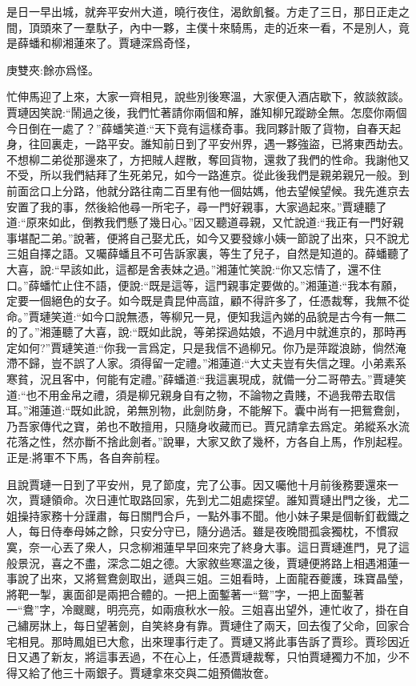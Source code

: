 \begin{parag}
    是日一早出城，就奔平安州大道，曉行夜住，渴飲飢餐。方走了三日，那日正走之間，頂頭來了一羣馱子，內中一夥，主僕十來騎馬，走的近來一看，不是別人，竟是薛蟠和柳湘蓮來了。賈璉深爲奇怪，\begin{note}庚雙夾:餘亦爲怪。\end{note}忙伸馬迎了上來，大家一齊相見，說些別後寒溫，大家便入酒店歇下，敘談敘談。賈璉因笑說:“鬧過之後，我們忙著請你兩個和解，誰知柳兄蹤跡全無。怎麼你兩個今日倒在一處了？”薛蟠笑道:“天下竟有這樣奇事。我同夥計販了貨物，自春天起身，往回裏走，一路平安。誰知前日到了平安州界，遇一夥強盜，已將東西劫去。不想柳二弟從那邊來了，方把賊人趕散，奪回貨物，還救了我們的性命。我謝他又不受，所以我們結拜了生死弟兄，如今一路進京。從此後我們是親弟親兄一般。到前面岔口上分路，他就分路往南二百里有他一個姑媽，他去望候望候。我先進京去安置了我的事，然後給他尋一所宅子，尋一門好親事，大家過起來。”賈璉聽了道:“原來如此，倒教我們懸了幾日心。”因又聽道尋親，又忙說道:“我正有一門好親事堪配二弟。”說著，便將自己娶尤氏，如今又要發嫁小姨一節說了出來，只不說尤三姐自擇之語。又囑薛蟠且不可告訴家裏，等生了兒子，自然是知道的。薛蟠聽了大喜，說:“早該如此，這都是舍表妹之過。”湘蓮忙笑說:“你又忘情了，還不住口。”薛蟠忙止住不語，便說:“既是這等，這門親事定要做的。”湘蓮道:“我本有願，定要一個絕色的女子。如今既是貴昆仲高誼，顧不得許多了，任憑裁奪，我無不從命。”賈璉笑道:“如今口說無憑，等柳兄一見，便知我這內娣的品貌是古今有一無二的了。”湘蓮聽了大喜，說:“既如此說，等弟探過姑娘，不過月中就進京的，那時再定如何?”賈璉笑道:“你我一言爲定，只是我信不過柳兄。你乃是萍蹤浪跡，倘然淹滯不歸，豈不誤了人家。須得留一定禮。”湘蓮道:“大丈夫豈有失信之理。小弟素系寒貧，況且客中，何能有定禮。”薛蟠道:“我這裏現成，就備一分二哥帶去。”賈璉笑道:“也不用金帛之禮，須是柳兄親身自有之物，不論物之貴賤，不過我帶去取信耳。”湘蓮道:“既如此說，弟無別物，此劍防身，不能解下。囊中尚有一把鴛鴦劍，乃吾家傳代之寶，弟也不敢擅用，只隨身收藏而已。賈兄請拿去爲定。弟縱系水流花落之性，然亦斷不捨此劍者。”說畢，大家又飲了幾杯，方各自上馬，作別起程。正是:將軍不下馬，各自奔前程。
\end{parag}


\begin{parag}
    且說賈璉一日到了平安州，見了節度，完了公事。因又囑他十月前後務要還來一次，賈璉領命。次日連忙取路回家，先到尤二姐處探望。誰知賈璉出門之後，尤二姐操持家務十分謹肅，每日關門合戶，一點外事不聞。他小妹子果是個斬釘截鐵之人，每日侍奉母姊之餘，只安分守已，隨分過活。雖是夜晚間孤衾獨枕，不慣寂寞，奈一心丟了衆人，只念柳湘蓮早早回來完了終身大事。這日賈璉進門，見了這般景況，喜之不盡，深念二姐之德。大家敘些寒溫之後，賈璉便將路上相遇湘蓮一事說了出來，又將鴛鴦劍取出，遞與三姐。三姐看時，上面龍吞夔護，珠寶晶瑩，將靶一掣，裏面卻是兩把合體的。一把上面鏨著一“鴛”字，一把上面鏨著一“鴦”字，冷颼颼，明亮亮，如兩痕秋水一般。三姐喜出望外，連忙收了，掛在自己繡房牀上，每日望著劍，自笑終身有靠。賈璉住了兩天，回去復了父命，回家合宅相見。那時鳳姐已大愈，出來理事行走了。賈璉又將此事告訴了賈珍。賈珍因近日又遇了新友，將這事丟過，不在心上，任憑賈璉裁奪，只怕賈璉獨力不加，少不得又給了他三十兩銀子。賈璉拿來交與二姐預備妝奩。
\end{parag}


